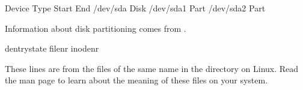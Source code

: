 \documentclass[letterpaper,10pt,english]{sphinxmanual}
\begin{document}
\begin{sphinxVerbatim}[commandchars=\\\{\}]
Device       Type      Start        End               
    
/dev/sda     Disk                              
/dev/sda1    Part                              
/dev/sda2    Part                        
\end{sphinxVerbatim}

Information about disk partitioning comes from .

\begin{sphinxVerbatim}[commandchars=\\\{\}]
dentry\PYGZhy{}state          
     file\PYGZhy{}nr       
    inode\PYGZhy{}nr   
\end{sphinxVerbatim}

These lines are from the files of the same name in the 
directory on Linux. Read the  man page to learn about the meaning of
these files on your system.
\end{document}
